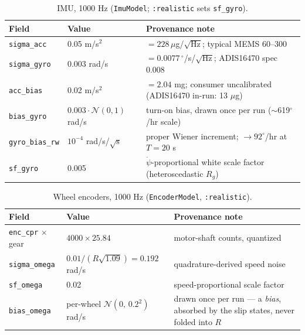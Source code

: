 \documentclass[11pt]{article}
\begin{document}
\begin{table}[h]\centering\footnotesize
\caption{IMU, 1000 Hz (\texttt{ImuModel}; \texttt{:realistic} sets \texttt{sf\_gyro}).}
\label{tab:imu}
\begin{tabular}{llp{6.6cm}}
\toprule
Field & Value & Provenance note\\
\midrule
\texttt{sigma\_acc} & 0.05 m/s$^2$ & $=228\,\mu$g/$\sqrt{\mathrm{Hz}}$; typical MEMS 60--300\\
\texttt{sigma\_gyro} & 0.003 rad/s & $=0.0077\,^\circ$/s/$\sqrt{\mathrm{Hz}}$; ADIS16470 spec 0.008\\
\texttt{acc\_bias} & 0.02 m/s$^2$ & $=2.04$ mg; consumer uncalibrated (ADIS16470 in-run: 13 $\mu$g)\\
\texttt{bias\_gyro} & $0.003\cdot\mathcal N(0,1)$ rad/s & turn-on bias, drawn once per run ($\sim$619$^\circ$/hr scale)\\
\texttt{gyro\_bias\_rw} & $10^{-4}$ rad/s/$\sqrt{\mathrm{s}}$ & proper Wiener increment; $\to 92^\circ$/hr at $T{=}20$ s\\
\texttt{sf\_gyro} & 0.005 & $\dot\psi$-proportional white scale factor (heteroscedastic $R_g$)\\
\bottomrule
\end{tabular}
\end{table}

\begin{table}[h]\centering\footnotesize
\caption{Wheel encoders, 1000 Hz (\texttt{EncoderModel}, \texttt{:realistic}).}
\label{tab:enc}
\begin{tabular}{llp{5.4cm}}
\toprule
Field & Value & Provenance note\\
\midrule
\texttt{enc\_cpr} $\times$ gear & $4000 \times 25.84$ & motor-shaft counts, quantized\\
\texttt{sigma\_omega} & $0.01/(R\sqrt{1.09})=0.192$ rad/s & quadrature-derived speed noise\\
\texttt{sf\_omega} & 0.02 & speed-proportional scale factor\\
\texttt{bias\_omega} & per-wheel $\mathcal N(0,\,0.2^2)$ rad/s & drawn once per run --- a \emph{bias},
absorbed by the slip states, never folded into $R$\\
\bottomrule
\end{tabular}
\end{table}
\end{document}
